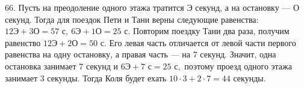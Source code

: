 66. Пусть на преодоление одного этажа тратится Э секунд, а на остановку --- О секунд. Тогда для поездок Пети и Тани верны следующие равенства: $12\text{Э}+3\text{О}=57\text{ с},\ 6\text{Э}+1\text{О}=25\text{ с}.$ Повторим поездку Тани два раза, получим равенство $12\text{Э}+2\text{О}=50\text{ с}.$ Его левая часть отличается от левой части первого равенства на одну остановку, а правая часть --- на 7 секунд. Значит, одна остановка занимает 7 секунд и
$6\text{Э}+7\text{ с}=25\text{ с},$ поэтому проезд одного этажа занимает 3 секунды. Тогда Коля будет ехать $10\cdot3+2\cdot7=44$ секунды.\\
